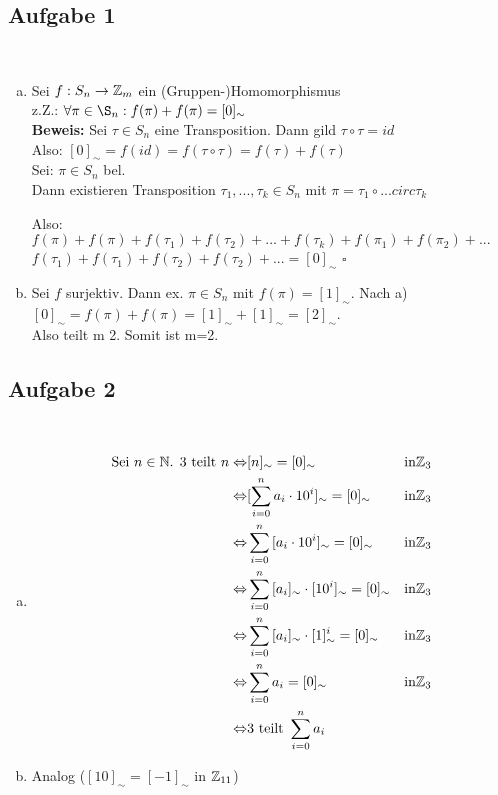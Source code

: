 \documentclass[a4paper,twoside,DIV15,BCOR12mm]{scrbook}
\newcommand{\enua}{\ \begin{enumerate}[a)]}
\newcommand{\une}{\end{enumerate}}
\newcommand{\LRA}{\Leftrightarrow}
\newcommand{\x}{\cdot}
\newenvironment{bew}{\pagebreak[2]\textbf{Beweis: }}{\qed}
\renewcommand{\qed}{\hspace*{\fill} \ensuremath{\square}}
\begin{document}
\subsection{Aufgabe 1}
\enua
\item
Sei $f:S_n\to\mathbb{Z}_m$ ein (Gruppen-)Homomorphismus\\
z.Z.: $\forall\pi\in\S_n: f(\pi)+f(\pi)=[0]_\sim$\\
\begin{bew} Sei $\tau\in S_n$ eine Transposition. Dann gild $\tau\circ\tau=id$\\
Also: $[0]_\sim=f(id)=f(\tau\circ\tau)=f(\tau)+f(\tau)$\\
Sei: $\pi\in S_n$ bel.\\
Dann existieren Transposition $\tau_1,...,\tau_k\in S_n$ mit $\pi=\tau_1\circ...circ\tau_k$\par
Also: $f(\pi)+f(\pi)+f(\tau_1)+f(\tau_2)+...+f(\tau_k)+f(\pi_1)+f(\pi_2)+...$\\
$f(\tau_1)+f(\tau_1)+f(\tau_2)+f(\tau_2)+...=[0]_\sim$
\end{bew}

\item
Sei $f$ surjektiv. Dann ex. $\pi\in S_n$ mit $f(\pi)=[1]_\sim$. Nach a) $[0]_\sim=f(\pi)+f(\pi)=[1]_\sim+[1]_\sim=[2]_\sim$.\\
Also teilt m 2. Somit ist m=2.
\une

\subsection{Aufgabe 2}
\enua
\item
\begin{eqnarray*}
\mbox{Sei }n\in\MdN\mbox{. }3\mbox{ teilt } n \LRA&[n]_\sim =[0]_\sim\quad & \mbox{in}\MdZ_3\\
\LRA&[\sum\limits_{i=0}^n{a_i\x10^i}]_\sim=[0]_\sim & \mbox{in}\MdZ_3\\
\LRA&\sum\limits_{i=0}^n{[a_i\x10^i]_\sim}=[0]_\sim & \mbox{in}\MdZ_3\\
\LRA&\sum\limits_{i=0}^n{[a_i]_\sim\x[10^i]_\sim}=[0]_\sim & \mbox{in}\MdZ_3\\
\LRA&\sum\limits_{i=0}^n{[a_i]_\sim\x[1]^i_\sim}=[0]_\sim & \mbox{in}\MdZ_3\\
\LRA&\sum\limits_{i=0}^n{a_i}=[0]_\sim & \mbox{in}\MdZ_3\\
\LRA&\mbox{3 teilt }\sum\limits_{i=0}^n{a_i}
\end{eqnarray*}
\item
Analog ($[10]_\sim=[-1]_\sim$ in $\mathbb{Z}_{11}$)
\une
\end{document}
